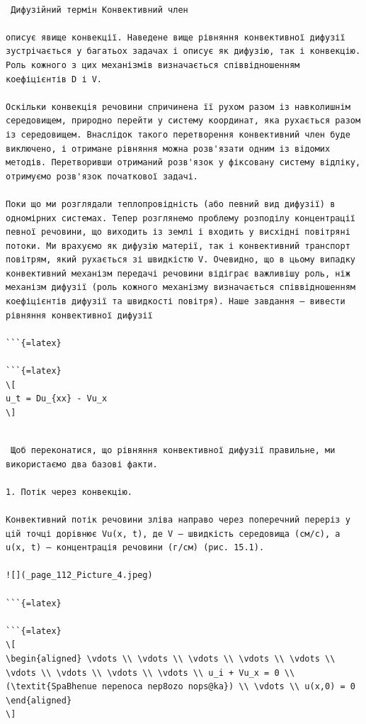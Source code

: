 \documentclass[
  ukrainian,
]{article}
\begin{document}
\begin{verbatim}

 Дифузійний термін Конвективний член

описує явище конвекції. Наведене вище рівняння конвективної дифузії зустрічається у багатьох задачах і описує як дифузію, так і конвекцію. Роль кожного з цих механізмів визначається співвідношенням коефіцієнтів D і V.

Оскільки конвекція речовини спричинена її рухом разом із навколишнім середовищем, природно перейти у систему координат, яка рухається разом із середовищем. Внаслідок такого перетворення конвективний член буде виключено, і отримане рівняння можна розв'язати одним із відомих методів. Перетворивши отриманий розв'язок у фіксовану систему відліку, отримуємо розв'язок початкової задачі.

Поки що ми розглядали теплопровідність (або певний вид дифузії) в одномірних системах. Тепер розглянемо проблему розподілу концентрації певної речовини, що виходить із землі і входить у висхідні повітряні потоки. Ми врахуємо як дифузію матерії, так і конвективний транспорт повітрям, який рухається зі швидкістю V. Очевидно, що в цьому випадку конвективний механізм передачі речовини відіграє важливішу роль, ніж механізм дифузії (роль кожного механізму визначається співвідношенням коефіцієнтів дифузії та швидкості повітря). Наше завдання — вивести рівняння конвективної дифузії

```{=latex}

```{=latex}
\[
u_t = Du_{xx} - Vu_x
\]
\end{verbatim}

\begin{verbatim}

 Щоб переконатися, що рівняння конвективної дифузії правильне, ми використаємо два базові факти.

1. Потік через конвекцію.

Конвективний потік речовини зліва направо через поперечний переріз у цій точці дорівнює Vu(x, t), де V — швидкість середовища (см/с), а u(x, t) — концентрація речовини (г/см) (рис. 15.1).

![](_page_112_Picture_4.jpeg)

```{=latex}

```{=latex}
\[
\begin{aligned} \vdots \\ \vdots \\ \vdots \\ \vdots \\ \vdots \\ \vdots \\ \vdots \\ \vdots \\ \vdots \\ u_i + Vu_x = 0 \\ (\textit{SpaBhenue nepenoca nep8ozo nops@ka}) \\ \vdots \\ u(x,0) = 0 \end{aligned}
\]
\end{verbatim}
\end{document}
